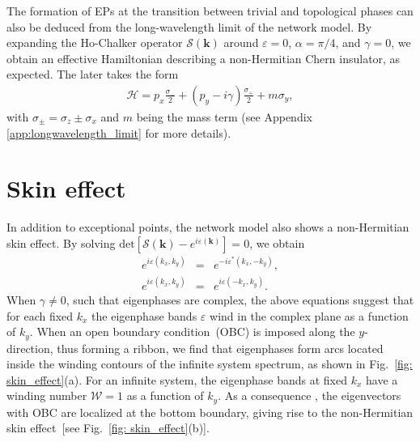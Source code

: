 \documentclass[aps,pra,reprint,superscriptaddress,showkeys,amsmath,amssymb,longbibliography]{revtex4-1}
\begin{document}
The formation of EPs at the transition between trivial and topological phases can also be deduced from the long-wavelength limit of the network model.
By expanding the Ho-Chalker operator $\mathcal{S}(\textbf{k})$ around $\varepsilon=0$, $\alpha=\pi/4$, and $\gamma=0$, we obtain an effective Hamiltonian describing a non-Hermitian Chern insulator, as expected.
The later takes the form 
\begin{eqnarray}
  \label{dirac non hermitian Chern ins}
\mathcal{H}=p_x\frac{\sigma_{-}}{2}+(p_y-i\gamma)\frac{\sigma_{+}}{2}+m\sigma_y,
\end{eqnarray}
with $\sigma_{\pm}=\sigma_z\pm \sigma_x$ and $m$ being the mass term (see Appendix \ref{app:longwavelength_limit} for more details).

\section{Skin effect}
\label{sec:se}

In addition to exceptional points, the network model also shows a non-Hermitian skin effect. 
By solving $\text{det}[\mathcal{S}(\textbf{k})-e^{ i \varepsilon ( \textbf{k} )}]=0$, we obtain
\begin{eqnarray}
e^{i\varepsilon(k_x, k_y)}&=&e^{-i\varepsilon^{*}(k_x,-k_y)},\label{eq: fix_kx}\\
e^{i\varepsilon(k_x, k_y)}&=&e^{i\varepsilon(-k_x,k_y)}. \label{eq: fix_ky}
\end{eqnarray} 
When $\gamma\neq0$, such that eigenphases are complex, the above equations suggest that for each fixed $k_x$ the eigenphase bands $\varepsilon$ wind in the complex plane as a function of $k_y$.
When an open boundary condition~(OBC) is imposed along the $y$-direction, thus forming a ribbon, we find that eigenphases form arcs located inside the winding contours of the infinite system spectrum, as shown in Fig.~\ref{fig: skin_effect}(a).
For an infinite system, the eigenphase bands at fixed $k_x$ have a winding number $\mathcal{W}=1$ as a function of $k_y$.
As a consequence \cite{Okuma2020}, the eigenvectors with OBC are localized at the bottom boundary, giving rise to the non-Hermitian skin effect~[see Fig.~\ref{fig: skin_effect}(b)].
\end{document}
